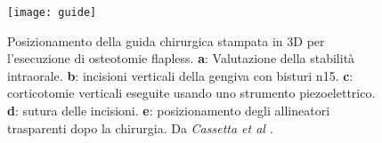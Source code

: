 \begin{figure}[h]
\vspace{-10pt}
	\begin{center}
	\texttt{[image: guide]}
    \caption{Posizionamento della guida chirurgica stampata in 3D per l'esecuzione di osteotomie flapless. \textbf{a}: Valutazione della stabilità intraorale. \textbf{b}: incisioni verticali della gengiva con bisturi n15. \textbf{c}: corticotomie verticali eseguite usando uno strumento piezoelettrico. \textbf{d}: sutura delle incisioni. \textbf{e}: posizionamento degli allineatori trasparenti dopo la chirurgia. Da \emph{Cassetta et al} \parencite{Reference114}.}
    \label{fig:guide}
	\end{center}
\vspace{-20pt}
\end{figure}

 
 